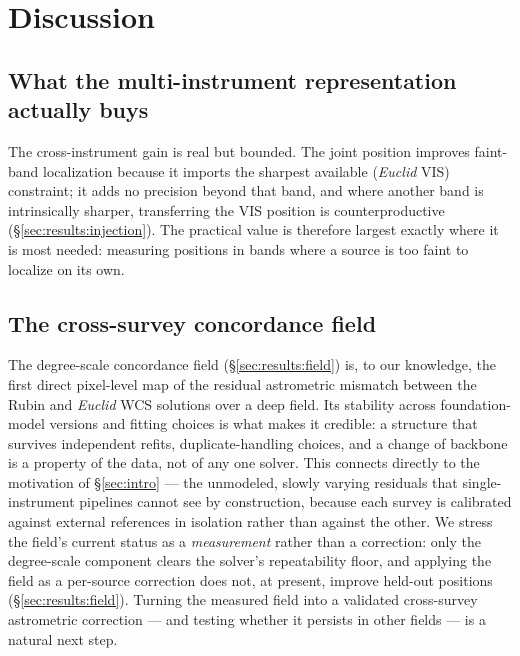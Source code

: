 \section{Discussion}
\label{sec:discussion}

\subsection{What the multi-instrument representation actually buys}
The cross-instrument gain is real but bounded. The joint position improves
faint-band localization because it imports the sharpest available
(\textit{Euclid} VIS) constraint; it adds no precision beyond that band, and
where another band is intrinsically sharper, transferring the VIS position is
counterproductive (\S\ref{sec:results:injection}). The practical value is
therefore largest exactly where it is most needed: measuring positions in bands
where a source is too faint to localize on its own.

\subsection{The cross-survey concordance field}
The degree-scale concordance field (\S\ref{sec:results:field}) is, to our
knowledge, the first direct pixel-level map of the residual astrometric mismatch
between the Rubin and \textit{Euclid} WCS solutions over a deep field. Its
stability across foundation-model versions and fitting choices is what makes it
credible: a structure that survives independent refits, duplicate-handling
choices, and a change of backbone is a property of the data, not of any one
solver. This connects directly to the motivation of \S\ref{sec:intro} --- the
unmodeled, slowly varying residuals that single-instrument pipelines cannot see
by construction, because each survey is calibrated against external references
in isolation rather than against the other. We stress the field's current
status as a \emph{measurement} rather than a correction: only the degree-scale
component clears the solver's repeatability floor, and applying the field as a
per-source correction does not, at present, improve held-out positions
(\S\ref{sec:results:field}). Turning the measured field into a validated
cross-survey astrometric correction --- and testing whether it persists in other
fields --- is a natural next step.

